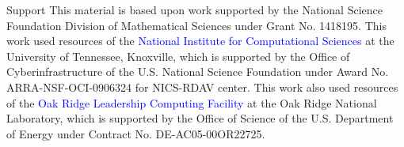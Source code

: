 \begin{frame}[noframenumbering]
\begin{block}{Support}\tiny
  This material is based upon work supported by the National Science
  Foundation Division of Mathematical Sciences under Grant No. 1418195.
  This work used resources of the \textcolor{blue}{National Institute for
  Computational Sciences} at the University of Tennessee, Knoxville,
  which is supported by the Office of Cyberinfrastructure of the
  U.S. National Science Foundation under Award  No. ARRA-NSF-OCI-0906324
  for NICS-RDAV center.
  This work also used resources of the \textcolor{blue}{Oak Ridge
  Leadership Computing Facility} at the Oak Ridge National
  Laboratory, which is supported by the Office of Science of the
  U.S. Department of Energy under Contract No. DE-AC05-00OR22725.\\[.2cm]
\end{block}
\end{frame}




